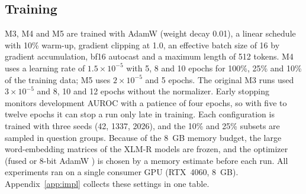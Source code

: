 \documentclass[manuscript,screen,review]{acmart}
\newcommand{\fit}[1]{\resizebox{\ifdim\width>\linewidth\linewidth\else\width\fi}{!}{#1}}
\begin{document}
\begin{table}[t]
\caption{Experimental design. Each research question with its data, detectors, primary metric and test. Post hoc analyses are marked.}
\label{tab:design}
\small
\fit{}
\end{table}

\subsection{Training}
M3, M4 and M5 are trained with AdamW \cite{loshchilov2019adamw} (weight decay 0.01), a linear schedule with 10\% warm-up, gradient clipping at 1.0, an effective batch size of 16 by gradient accumulation, bf16 autocast and a maximum length of 512 tokens. M4 uses a learning rate of $1.5\times10^{-5}$ with 5, 8 and 10 epochs for 100\%, 25\% and 10\% of the training data; M5 uses $2\times10^{-5}$ and 5 epochs. The original M3 runs used $3\times10^{-5}$ and 8, 10 and 12 epochs without the normalizer. Early stopping monitors development AUROC with a patience of four epochs, so with five to twelve epochs it can stop a run only late in training. Each configuration is trained with three seeds (42, 1337, 2026), and the 10\% and 25\% subsets are sampled in question groups. Because of the 8~GB memory budget, the large word-embedding matrices of the XLM-R models are frozen, and the optimizer (fused or 8-bit AdamW \cite{dettmers2022optimizers}) is chosen by a memory estimate before each run. All experiments ran on a single consumer GPU (RTX~4060, 8~GB). Appendix~\ref{app:impl} collects these settings in one table.
\end{document}
